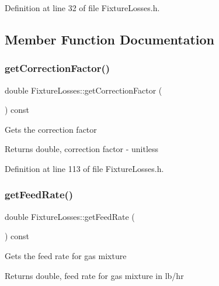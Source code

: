 Definition at line 32 of file Fixture\+Losses.\+h.



\subsection{Member Function Documentation}
\mbox{\label{class_fixture_losses_af643d715a8b1369efa586fa43e75c732}} 
\subsubsection{\texorpdfstring{get\+Correction\+Factor()}{getCorrectionFactor()}}
{\footnotesize\ttfamily double Fixture\+Losses\+::get\+Correction\+Factor (\begin{DoxyParamCaption}{ }\end{DoxyParamCaption}) const\hspace{0.3cm}{\ttfamily [inline]}}

Gets the correction factor \begin{DoxyReturn}{Returns}
double, correction factor -\/ unitless 
\end{DoxyReturn}


Definition at line 113 of file Fixture\+Losses.\+h.

\mbox{\label{class_fixture_losses_a09707af8de4b304c65f4aeb1130ea44e}} 
\subsubsection{\texorpdfstring{get\+Feed\+Rate()}{getFeedRate()}}
{\footnotesize\ttfamily double Fixture\+Losses\+::get\+Feed\+Rate (\begin{DoxyParamCaption}{ }\end{DoxyParamCaption}) const\hspace{0.3cm}{\ttfamily [inline]}}

Gets the feed rate for gas mixture \begin{DoxyReturn}{Returns}
double, feed rate for gas mixture in lb/hr 
\end{DoxyReturn}


